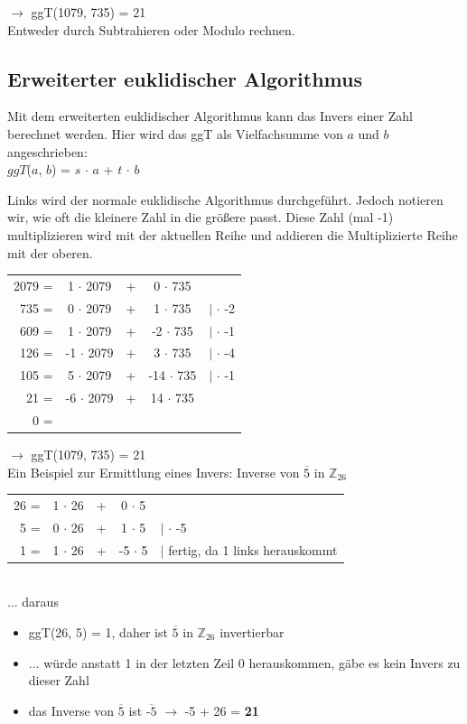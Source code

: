 $\rightarrow$ ggT(1079, 735) = 21 \\
Entweder durch Subtrahieren oder Modulo rechnen.

\subsection{Erweiterter euklidischer Algorithmus}
Mit dem erweiterten euklidischer Algorithmus kann das Invers einer Zahl berechnet werden. Hier wird das ggT als Vielfachsumme von $a$ und $b$ angeschrieben: \\
$ggT$($a$, $b$) = $s$ $\cdot$ $a$ + $t$ $\cdot$ $b$

Links wird der normale euklidische Algorithmus durchgeführt. Jedoch notieren wir, wie oft die kleinere Zahl in die größere passt. Diese Zahl (mal -1) multiplizieren wird mit der aktuellen Reihe und addieren die Multiplizierte Reihe mit der oberen.

\begin{tabular}{rcccl}
	2079 = & 1 $\cdot$ 2079 & + & 0 $\cdot$ 735 &  \\
	735 = & 0 $\cdot$ 2079 & + & 1 $\cdot$ 735 & $|$ $\cdot$ -2 \\
	609 = & 1 $\cdot$ 2079 & + & -2 $\cdot$ 735 & $|$ $\cdot$ -1 \\
	126 = & -1 $\cdot$ 2079 & + & 3 $\cdot$ 735 & $|$ $\cdot$ -4 \\
	105 = & 5 $\cdot$ 2079 & + & -14 $\cdot$ 735 & $|$ $\cdot$ -1 \\
	21 = & -6 $\cdot$ 2079 & + & 14 $\cdot$ 735 & \\
	0 = &  & &  & \\
\end{tabular}

$\rightarrow$ ggT(1079, 735) = 21 \\

Ein Beispiel zur Ermittlung eines Invers: Inverse von $\overline{\text{5}}$ in $\mathbb{Z}_{26}$ \\
\begin{tabular}{rcccl}
	26 = & 1 $\cdot$ 26 & + & 0 $\cdot$ 5 &  \\
	5 = & 0 $\cdot$ 26 & + & 1 $\cdot$ 5 & $|$ $\cdot$ -5 \\
	1 = & 1 $\cdot$ 26 & + & -5 $\cdot$ 5 & $|$ fertig, da 1 links herauskommt
\end{tabular} \\
... daraus 
\begin{itemize}
	\item ggT(26, 5) = 1, daher ist $\overline{\text{5}}$ in $\mathbb{Z}_{26}$ invertierbar
	\item[] ... würde anstatt 1 in der letzten Zeil 0 herauskommen, gäbe es kein Invers zu dieser Zahl
	\item das Inverse von $\overline{\text{5}}$ ist $\overline{\text{-5}}$ $\rightarrow$ -5 + 26 = \textbf{21}
\end{itemize}

